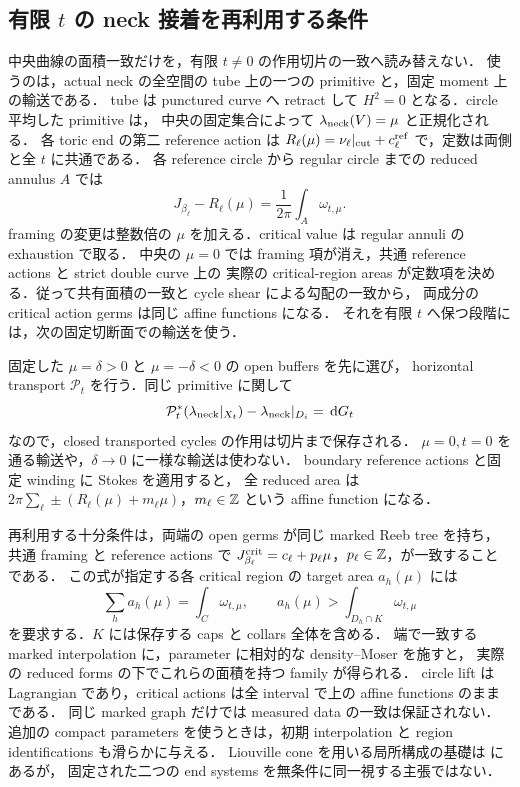\subsection{有限 \texorpdfstring{$t$}{t} の neck 接着を再利用する条件}

中央曲線の面積一致だけを，有限 $t\ne0$ の作用切片の一致へ読み替えない．
使うのは，actual neck の全空間の tube 上の一つの primitive と，固定 moment 上の輸送である．
tube は punctured curve へ retract して $H^2=0$ となる．circle 平均した primitive は，
中央の固定集合によって $\lambda_{\rm neck}(V)=\mu$ と正規化される．
各 toric end の第二 reference action は
$R_\ell(\mu)=\nu_\ell|_{\rm cut}+c_\ell^{\rm ref}$ で，定数は両側と全 $t$ に共通である．
各 reference circle から regular circle までの reduced annulus $A$ では
\[
 J_{\beta_\ell}-R_\ell(\mu)=\frac1{2\pi}\int_A\omega_{t,\mu}.
\]
framing の変更は整数倍の $\mu$ を加える．critical value は regular annuli の exhaustion で取る．
中央の $\mu=0$ では framing 項が消え，共通 reference actions と strict double curve 上の
実際の critical-region areas が定数項を決める．従って共有面積の一致と cycle shear による勾配の一致から，
両成分の critical action germs は同じ affine functions になる．
それを有限 $t$ へ保つ段階には，次の固定切断面での輸送を使う．

固定した $\mu=\delta>0$ と $\mu=-\delta<0$ の open buffers を先に選び，
horizontal transport $\mathcal P_t$ を行う．同じ primitive に関して
\[
 \mathcal P_t^*(\lambda_{\rm neck}|_{X_t})
 -\lambda_{\rm neck}|_{D_i}=\,\mathrm d G_t
\]
なので，closed transported cycles の作用は切片まで保存される．
$\mu=0,t=0$ を通る輸送や，$\delta\to0$ に一様な輸送は使わない．
boundary reference actions と固定 winding に Stokes を適用すると，
全 reduced area は $2\pi\sum_\ell\pm(R_\ell(\mu)+m_\ell\mu)$，$m_\ell\in\mathbb Z$ という affine function になる．

再利用する十分条件は，両端の open germs が同じ marked Reeb tree を持ち，
共通 framing と reference actions で
$J^{\rm crit}_{\beta_\ell}=c_\ell+p_\ell\mu$，$p_\ell\in\mathbb Z$，が一致することである．
この式が指定する各 critical region の target area $a_h(\mu)$ には
\[
 \sum_h a_h(\mu)=\int_C\omega_{t,\mu},\qquad
 a_h(\mu)>\int_{D_h\cap K}\omega_{t,\mu}
\]
を要求する．$K$ には保存する caps と collars 全体を含める．
端で一致する marked interpolation に，parameter に相対的な density--Moser を施すと，
実際の reduced forms の下でこれらの面積を持つ family が得られる．
circle lift は Lagrangian であり，critical actions は全 interval で上の affine functions のままである．
同じ marked graph だけでは measured data の一致は保証されない\cite{DMT,IKM}．
追加の compact parameters を使うときは，初期 interpolation と region identifications も滑らかに与える．
Liouville cone を用いる局所構成の基礎は \cite{EM} にあるが，
固定された二つの end systems を無条件に同一視する主張ではない．

